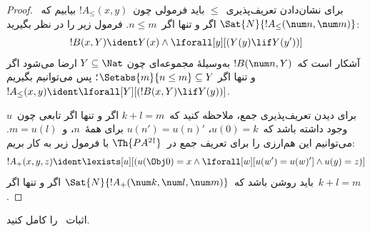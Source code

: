 \documentclass[../../../include/open-logic-section]{subfiles}
\begin{document}
\begin{proof}
برای نشان‌دادن تعریف‌پذیری~$\le$ باید فرمولی چون~$!A_\le(x, y)$ بیابیم
که~$\Sat{N}{!A_\le(\num n, \num m)}$ اگر و تنها اگر~$n \le m$. فرمول
زیر را در نظر بگیرید:
\[
!B(x, Y) \ident Y(x) \land \lforall[y][(Y(y) \lif Y(y'))]
\]
آشکار است که~$!B(\num n, Y)$ به‌وسیلهٔ مجموعه‌ای چون
$Y \subseteq \Nat$ ارضا می‌شود اگر و تنها اگر
$\Setabs{m}{n \le m} \subseteq Y$؛ پس می‌توانیم بگیریم
$!A_\le(x, y) \ident \lforall[Y][(!B(x, Y) \lif Y(y))]$.

برای دیدن تعریف‌پذیری جمع، ملاحظه کنید که~$k+l=m$ اگر و تنها اگر تابعی
چون~$u$ وجود داشته باشد که~$u(0)=k$، $u(n')=u(n)'$ برای همهٔ~$n$،
  و~$m = u(l)$. می‌توانیم این هم‌ارزی را برای تعریف جمع
در~$\Th{PA^{2\dagger}}$ با فرمول زیر به کار بریم:
\[
!A_+(x,y,z) \ident \lexists[u][(u(\Obj 0)=x \land \lforall[w][u(w')=u(w)']
  \land u(y)=z)]
\]
باید روشن باشد که~$\Sat{N}{!A_+(\num k, \num l, \num m)}$ اگر و تنها
اگر~$k+l=m$.
\end{proof}

\begin{prob}
اثبات~ را کامل کنید.
\end{prob}
\end{document}
